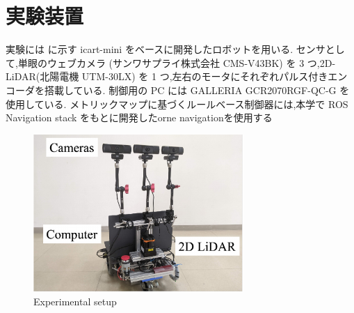\section{実験装置}
実験には  に示す icart-mini\cite{icart} をベースに開発したロボットを用いる.
センサとして,単眼のウェブカメラ (サンワサプライ株式会社 CMS-V43BK) を 3 つ,2D-LiDAR(北陽電機 UTM-30LX) を 1 つ,左右のモータにそれぞれパルス付きエンコーダを搭載している.
制御用の PC には GALLERIA GCR2070RGF-QC-G を使用している.
メトリックマップに基づくルールベース制御器には,本学で ROS Navigation stack をもとに開発したorne navigation\cite{orne_nav}を使用する

\begin{figure}[htbp]
    \centering
     \includegraphics[width=80mm]{images/pdf/haruyama/gamma.pdf}
     \caption{Experimental setup}
     \label{fig:gamma}
\end{figure}